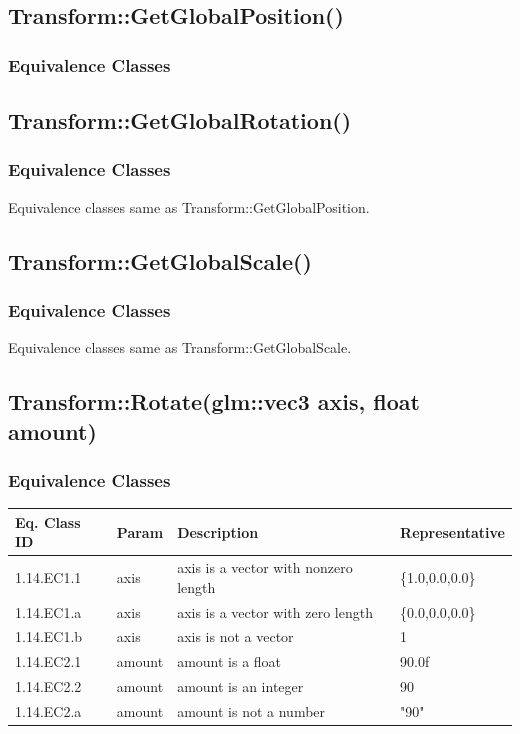 \documentclass[11pt]{article}
\begin{document}
\subsection{Transform::GetGlobalPosition()}
\label{sec:org9ac7cf9}

\subsubsection*{Equivalence Classes}
\label{sec:org870d2e9}
\subsection{Transform::GetGlobalRotation()}
\label{sec:orgcda697f}

\subsubsection*{Equivalence Classes}
\label{sec:orgede1bd1}
Equivalence classes same as Transform::GetGlobalPosition.
\subsection{Transform::GetGlobalScale()}
\label{sec:org3ae0441}

\subsubsection*{Equivalence Classes}
\label{sec:orge975a93}
Equivalence classes same as Transform::GetGlobalScale.
\subsection{Transform::Rotate(glm::vec3 axis, float amount)}
\label{sec:org3db331e}

\subsubsection*{Equivalence Classes}
\label{sec:org121c7ac}
\begin{center}
\begin{tabularx}{\textwidth}{lXXX}
\hline
\textbf{Eq. Class ID} & \textbf{Param} & \textbf{Description} & \textbf{Representative}\\
\hline
1.14.EC1.1 & axis & axis is a vector with nonzero length & \{1.0,0.0,0.0\}\\
\hline
1.14.EC1.a & axis & axis is a vector with zero length & \{0.0,0.0,0.0\}\\
\hline
1.14.EC1.b & axis & axis is not a vector & 1\\
\hline
1.14.EC2.1 & amount & amount is a float & 90.0f\\
\hline
1.14.EC2.2 & amount & amount is an integer & 90\\
\hline
1.14.EC2.a & amount & amount is not a number & "90"\\
\hline
\end{tabularx}
\end{center}
\end{document}
